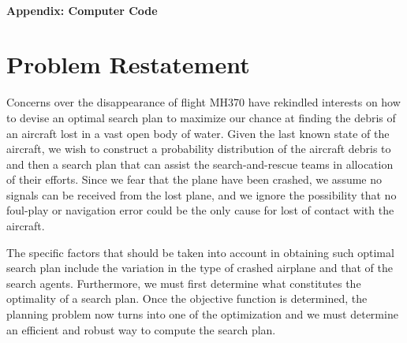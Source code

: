 \documentclass[12pt, letterpaper]{article}  %
\theoremstyle{definition}
\theoremstyle{remark}
\theoremstyle{plain}
\begin{document}
\newpage



   \doublespacing


\tableofcontents
\ \\

\textbf{Appendix: Computer Code}\\

\newpage

\setcounter{page}{1}   




\section{Problem Restatement}\label{sec:restate}

Concerns over the disappearance of flight MH370 have rekindled interests on how to devise an optimal search plan to maximize our chance at finding the debris of an aircraft lost in a vast open body of water. Given the last known state of the aircraft, we wish to construct a probability distribution of the aircraft debris to and then a search plan that can assist the search-and-rescue teams in allocation of their efforts. Since we fear that the plane have been crashed, we assume no signals can be received from the lost plane, and we ignore the possibility that no foul-play or navigation error could be the only cause for lost of contact with the aircraft.

The specific factors that should be taken into account in obtaining such optimal search plan
include the variation in the type of crashed airplane and that of the search agents. Furthermore, we must first determine what constitutes the optimality of a search plan. Once the objective function is determined, the planning problem now turns into one of the optimization and we must
determine an efficient and robust way to compute the search plan.
\end{document}
